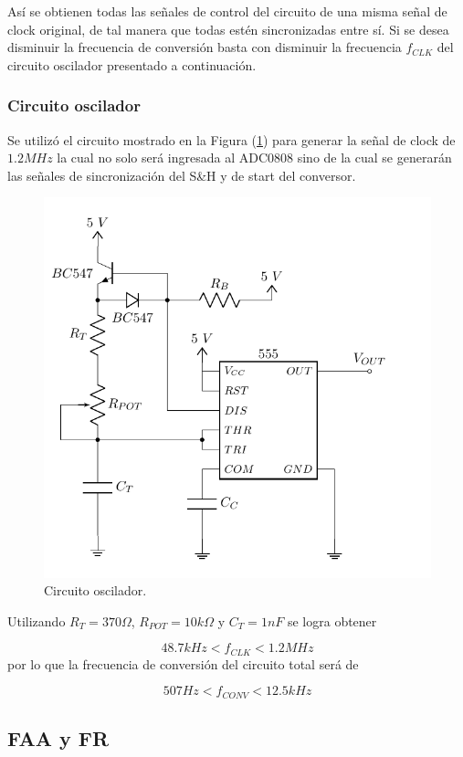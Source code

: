 Así se obtienen todas las señales de control del circuito de una misma señal de clock original, de tal manera que todas estén sincronizadas entre sí. Si se desea disminuir la frecuencia de conversión basta con disminuir la frecuencia $f_{CLK}$ del circuito oscilador presentado a continuación.

\subsubsection{Circuito oscilador}

Se utilizó el circuito mostrado en la Figura (\ref{555}) para generar la señal de clock de $1.2MHz$ la cual no solo será ingresada al ADC0808 sino de la cual se generarán las señales de sincronización del S\&H y de start del conversor.

\begin{figure}[H]
\centering
\includegraphics[width=0.6\linewidth, page=1]{ImagenesEjercicio1/Components.pdf}
\caption{Circuito oscilador.}
\label{555}
\end{figure}

Utilizando $R_{T} = 370\Omega$, $R_{POT} = 10k\Omega$ y $C_{T} = 1nF$ se logra obtener

\[ 48.7kHz < f_{CLK} < 1.2MHz\]
por lo que la frecuencia de conversión del circuito total será de

\[ 507Hz < f_{CONV} < 12.5kHz \]

\subsection{FAA y FR}


